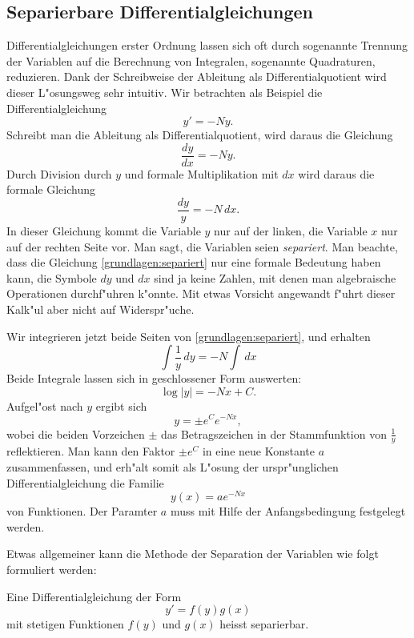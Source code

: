 \subsection{Separierbare Differentialgleichungen}
Differentialgleichungen erster Ordnung lassen sich oft durch sogenannte
Trennung der Variablen auf die Berechnung von Integralen, sogenannte
Quadraturen, reduzieren.
%
%
%
Dank der Schreibweise der Ableitung als Differentialquotient wird
dieser L"osungsweg sehr intuitiv.
Wir betrachten als Beispiel die Differentialgleichung
\[
y'=-Ny.
\]
Schreibt man die Ableitung als Differentialquotient, wird daraus die
Gleichung
\[
\frac{dy}{dx}=-Ny.
\]
Durch Division durch $y$ und formale Multiplikation mit $dx$ wird daraus
die formale Gleichung
\begin{equation}
\frac{dy}{y}=-N\,dx.
\label{grundlagen:separiert}
\end{equation}
In dieser Gleichung kommt die Variable $y$ nur auf der linken, die Variable
$x$ nur auf der rechten Seite vor.
Man sagt, die Variablen seien {\em separiert}.
%
Man beachte, dass die Gleichung \eqref{grundlagen:separiert} nur eine
formale Bedeutung haben kann, die Symbole $dy$ und $dx$ sind ja keine Zahlen,
mit denen man algebraische Operationen durchf"uhren k"onnte.
Mit etwas Vorsicht angewandt f"uhrt dieser Kalk"ul aber nicht auf
Widerspr"uche.

Wir integrieren jetzt beide Seiten von \eqref{grundlagen:separiert}, und
erhalten 
\[
\int\frac1y\,dy=-N\int\,dx
\]
Beide Integrale lassen sich in geschlossener Form auswerten:
\[
\log|y|=-Nx+C.
\]
Aufgel"ost nach $y$ ergibt sich
\[
y=\pm e^{C}e^{-Nx},
\]
wobei die beiden Vorzeichen $\pm$ das Betragszeichen in der Stammfunktion
von $\frac1y$ reflektieren.
Man kann den Faktor $\pm e^{C}$ in eine neue Konstante $a$ zusammenfassen,
und erh"alt somit als L"osung der urspr"unglichen Differentialgleichung
die Familie
\[
y(x)=ae^{-Nx}
\]
von Funktionen.
Der Paramter $a$ muss mit Hilfe der Anfangsbedingung festgelegt werden.

Etwas allgemeiner kann die Methode der Separation der Variablen wie folgt
formuliert werden:
\begin{definition}
\label{grundlagen:definition:separierbar}
Eine Differentialgleichung der Form
\[
y'=f(y) g(x)
\]
mit stetigen Funktionen $f(y)$ und $g(x)$ heisst separierbar.
\end{definition}

